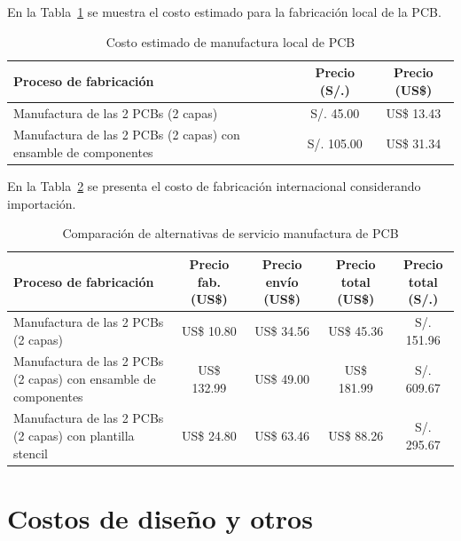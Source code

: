 \noindent
En la Tabla~\ref{tab:pcb_local} se muestra el costo estimado para la fabricación local de la \ac{PCB}.
\begin{table}[H]
\centering
\caption{Costo estimado de manufactura local de \ac{PCB}}
\label{tab:pcb_local}

\vspace{0.5em}

\begin{tabular}{|>{\raggedright\arraybackslash}m{7cm}||c|c|}
\hline
Proceso de fabricación & Precio (S/.) & Precio (US\$) \\
\hline
Manufactura de las 2 PCBs (2 capas) 
& S/. 45.00 
& US\$ 13.43 \\
\hline
Manufactura de las 2 PCBs (2 capas) con ensamble de componentes 
& S/. 105.00 
& US\$ 31.34 \\
\hline
\end{tabular}
\end{table}

\noindent
En la Tabla~\ref{tab:pcb_internacional} se presenta el costo de fabricación internacional considerando importación.

\begin{table}[H]
\centering
\caption{Comparación de alternativas de servicio manufactura de \ac{PCB}}
\label{tab:pcb_internacional}

\vspace{0.5em}

\begin{tabular}{|p{6.3cm}||c|c|c|c|}
\hline
Proceso de fabricación 
& \shortstack{Precio fab.\\(US\$)} 
& \shortstack{Precio envío\\(US\$)} 
& \shortstack{Precio total\\(US\$)} 
& \shortstack{Precio total\\(S/.)} \\
\hline
Manufactura de las 2 PCBs (2 capas) 
& US\$ 10.80 
& US\$ 34.56 
& US\$ 45.36 
& S/. 151.96 \\
\hline
Manufactura de las 2 PCBs (2 capas) con ensamble de componentes 
& US\$ 132.99 
& US\$ 49.00 
& US\$ 181.99 
& S/. 609.67 \\
\hline
Manufactura de las 2 PCBs (2 capas) con plantilla stencil 
& US\$ 24.80 
& US\$ 63.46 
& US\$ 88.26 
& S/. 295.67 \\
\hline
\end{tabular}
\end{table}

\section{Costos de diseño y otros}

